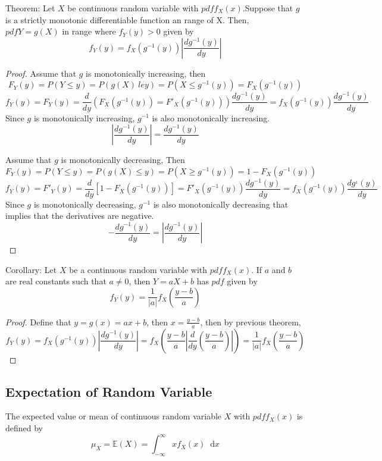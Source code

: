 \documentclass{article}
\newcommand{\E}{\mathbb{E}}
\newcommand{\uint}[4]{\int_{#1}^{#2} #3 \dd #4}
\newcommand{\dd}{\mathop{}\!\mathrm{d}}
\begin{document}
\noindent Theorem: Let $X$ be continuous random variable with $pdf f_X(x)$.Suppose that $g$ is a strictly monotonic differentiable function an range of X. Then, $pdf Y = g(X)$ in range where $f_Y(y) > 0$ given by 
$$f_Y(y) = f_X(g^{-1}(y))|\frac{dg^{-1}(y)}{dy}|$$

\begin{proof}
    Assume that $g$ is monotonically increasing, then
    $$F_Y(y) = P(Y \le y) = P(g(X) \ le y) = P(X \le g^{-1}(y)) = F_X(g^{-1}(y))$$
    $$f_Y(y) = F_Y(y) = \frac{d}{dy}(F_X(g^{-1}(y)) = F'_X(g^{-1}(y)))\frac{dg^{-1}(y)}{dy} = f_X(g^{-1}(y))\frac{dg^{-1}(y)}{dy}$$
    Since $g$ is monotonically increasing, $g^{-1}$ is also monotonically increasing.
    $$|\frac{dg^{-1}(y)}{dy}| = \frac{dg^{-1}(y)}{dy}$$

    \noindent Assume that $g$ is monotonically decreasing,  Then
    $$F_Y(y) = P(Y \le y) = P(g(X) \le y) = P(X \ge g^{-1}(y)) = 1 - F_X(g^{-1}(y))$$
    $$f_Y(y) = F'_Y(y) = \frac{d}{dy}[1 - F_X(g^{-1}(y))] = F'_X(g^{-1}(y))\frac{dg^{-1}(y)}{dy} = f_X(g^{-1}(y))\frac{dg^{_1}(y)}{dy}$$
    Since $g$ is monotonically decreasing, $g^{-1}$ is also monotonically decreasing that implies that the derivatives are negative.
    $$- \frac{dg^{-1}(y)}{dy} = |\frac{dg^{-1}(y)}{dy}|$$
\end{proof}

Corollary: Let $X$ be a continuous random variable with $pdf f_X(x)$. If $a$ and $b$ are real constants such that $a \ne 0$, then $Y = aX + b$ has $pdf$ given by
$$f_Y(y) = \frac{1}{|a|}f_X(\frac{y - b}{a})$$
\begin{proof}
    Define that $y = g(x) = ax + b$, then $x = \frac{y - b}{a}$, then by previous theorem,
    $$f_Y(y) = f_X(g^{-1}(y))|\frac{dg^{-1}(y)}{dy}| = f_X(\frac{y-b}{a}|\frac{d}{dy}(\frac{y-b}{a})|) = \frac{1}{|a|}f_X(\frac{y-b}{a})$$
\end{proof}

\subsection{Expectation of Random Variable}
The expected value or mean of continuous random variable $X$ with $pdf f_X(x)$ is defined by 
$$\mu_X = \E(X) = \uint{-\infty}{\infty}{xf_X(x)}{x}$$
\end{document}
